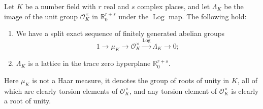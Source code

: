 \begin{proposition}[15.11]
Let $K$ be a number field with $r$ real and $s$ complex places, and let $\Lambda_K$ be the image of the unit group $\mathcal O_K^\times$ in $\mathbb R^{r+s}_0$ under the $\operatorname{Log}$ map. The following hold:
\begin{enumerate}
\item We have a split exact sequence of finitely generated abelian groups
\[
1\longrightarrow\mu_K\longrightarrow\mathcal O_K^\times
\xrightarrow{\operatorname{Log}}\Lambda_K\longrightarrow0;
\]
\item $\Lambda_K$ is a lattice in the trace zero hyperplane $\mathbb R^{r+s}_0$.
\end{enumerate}
\end{proposition}
Here $\mu_K$ is not a Haar measure, it denotes the group of roots of unity in $K$, all of which are clearly torsion elements of $\mathcal O_K^\times$, and any torsion element of $\mathcal O_K^\times$ is clearly a root of unity.
